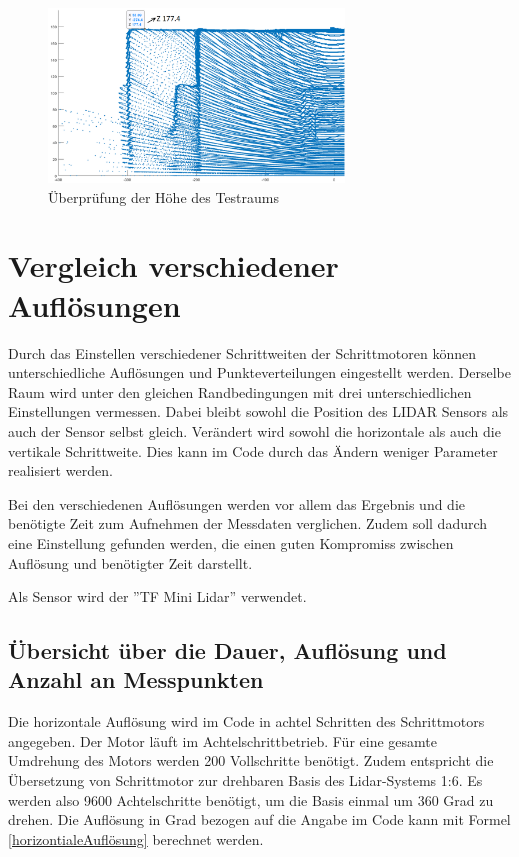 \begin{figure} [H]
	\centering
	\includegraphics[width=0.7\textwidth]{images/Validierung/Genauigkeit/Hoehe1}
	\caption{Überprüfung der Höhe des Testraums}
	\label{Hoehe}
\end{figure}


\section{Vergleich verschiedener Auflösungen}

Durch das Einstellen verschiedener Schrittweiten der Schrittmotoren können unterschiedliche Auflösungen und Punkteverteilungen eingestellt werden. Derselbe Raum wird unter den gleichen Randbedingungen mit drei unterschiedlichen Einstellungen vermessen. Dabei bleibt sowohl die Position des \ac{LIDAR} Sensors als auch der Sensor selbst gleich. Verändert wird sowohl die horizontale als auch die vertikale Schrittweite. Dies kann im Code durch das Ändern weniger Parameter realisiert werden.

Bei den verschiedenen Auflösungen werden vor allem das Ergebnis und die benötigte Zeit zum Aufnehmen der Messdaten verglichen. Zudem soll dadurch eine Einstellung gefunden werden, die einen guten Kompromiss zwischen Auflösung und benötigter Zeit darstellt. 

Als Sensor wird der ''TF Mini Lidar'' verwendet.


\subsection{Übersicht über die Dauer, Auflösung und Anzahl an Messpunkten} \label{sec:auflösung}

Die horizontale Auflösung wird im Code in achtel Schritten des Schrittmotors angegeben. Der Motor läuft im Achtelschrittbetrieb. Für eine gesamte Umdrehung des Motors werden 200 Vollschritte benötigt. Zudem entspricht die Übersetzung von Schrittmotor zur drehbaren Basis des Lidar-Systems 1:6. Es werden also 9600 Achtelschritte benötigt, um die Basis einmal um 360 Grad zu drehen. Die Auflösung in Grad bezogen auf die Angabe im Code kann mit Formel \ref{horizontialeAuflösung} berechnet werden. 

